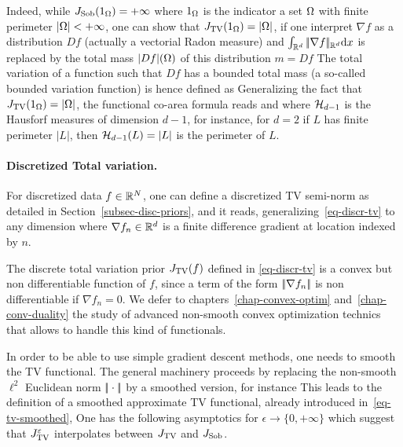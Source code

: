 Indeed, while $J_{\text{Sob}}(1_{\Omega}) = +\infty$ where $1_{\Omega}$ is the indicator a set $\Omega$ with finite perimeter $|\Omega|<+\infty$, one can show that $J_{\text{TV}}(1_{\Omega})=|\Omega|$, if one interpret $\nabla f$ as a distribution $Df$ (actually a vectorial Radon measure) and $\int_{\mathbb{R}^d} |\!| \nabla f |\!|_{\mathbb{R}^d} \mathrm{d} x$ is replaced by the total mass $|Df|(\Omega)$ of this distribution $m=Df$
The total variation of a function such that $Df$ has a bounded total mass (a so-called bounded variation function) is hence defined as
Generalizing the fact that $J_{\text{TV}}(1_\Omega)=|\Omega|$, the functional co-area formula reads
and where $\mathcal{H}_{d-1}$ is the Hausforf measures of dimension $d-1$, for instance, for $d=2$ if $L$ has finite perimeter $|L|$, then $\mathcal{H}_{d-1}(L)=|L|$ is the perimeter of $L$.


\paragraph{Discretized Total variation.}

For discretized data $f \in \mathbb{R}^N$, one can define a discretized TV semi-norm as detailed in Section~\ref{subsec-disc-priors}, and it reads, generalizing~\eqref{eq-discr-tv} to any dimension
where $\nabla f_n \in \mathbb{R}^d$ is a finite difference gradient at location indexed by $n$. 


The discrete total variation prior $J_{\text{TV}}(f)$ defined in \eqref{eq-discr-tv} is a convex but non differentiable function of $f$, since a term of the form $|\!| \nabla f_n |\!|$ is non differentiable if $\nabla f_n=0$.
%
We defer to chapters~\ref{chap-convex-optim} and~\ref{chap-conv-duality} the study of advanced non-smooth convex optimization technics that allows to handle this kind of functionals.

In order to be able to use simple gradient descent methods, one needs to smooth the TV functional. The general machinery proceeds by replacing the non-smooth $\ell^2$ Euclidean norm $|\!| \cdot |\!|$ by a smoothed version, for instance
This leads to the definition of a smoothed approximate TV functional, already introduced in~\eqref{eq-tv-smoothed}, 
One has the following asymptotics for $\epsilon \rightarrow \{0,+\infty\}$
which suggest that $J_{\text{TV}}^\varepsilon$ interpolates between $J_{\text{TV}}$ and $J_{\text{Sob}}$.

